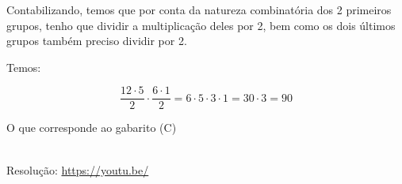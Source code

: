 Contabilizando, temos que por conta da natureza combinatória dos 2 primeiros grupos, tenho que dividir a multiplicação deles por 2, bem como os dois últimos grupos também preciso dividir por 2.

Temos:

\[
\dfrac{12 \cdot 5}{2} \cdot \dfrac{6 \cdot 1}{2} = 6 \cdot 5 \cdot 3 \cdot 1 = 30 \cdot 3 = 90
\]

O que corresponde ao gabarito (C)

\begin{center}
    \href{https://youtu.be/}{
    }\\
    Resolução: \url{https://youtu.be/}
\end{center}
